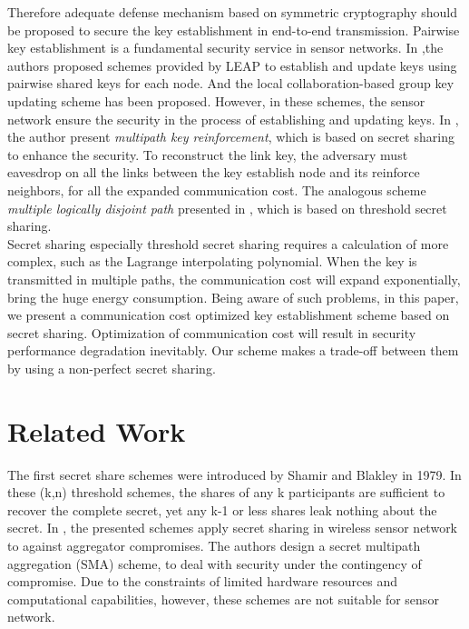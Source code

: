 \documentclass[nocopyrightspace,9pt]{sigplanconf}
\begin{document}
Therefore adequate defense mechanism based on symmetric cryptography
should be proposed to secure the key establishment in end-to-end
transmission. Pairwise key establishment is a fundamental security service in sensor networks\cite{liu2005establishing}.
In \cite{zhu2006leap},the authors proposed schemes provided by LEAP to establish
and update keys using pairwise shared keys for each node. And the local
collaboration-based group key updating scheme has been proposed\cite{zhang2005group}.
However, in these schemes, the sensor network
ensure the security in the process of establishing and updating keys.
In \cite{chan2003random}, the author present \textit{multipath key reinforcement}, which is based
on secret sharing to enhance the security. To reconstruct the
link key, the adversary must eavesdrop on all
the links between the key establish node and its reinforce neighbors, for all the
expanded communication cost. The analogous scheme \textit{multiple logically disjoint path} presented in
\cite{zhu2003establishing}, which is based on threshold secret sharing.\\

Secret sharing especially threshold secret sharing requires a calculation of more
complex, such as the Lagrange interpolating polynomial\cite{Shamir:secret}.
When the key is transmitted in multiple paths, the communication cost will
expand exponentially, bring the huge energy consumption. Being aware of such
problems, in this paper, we present a communication cost optimized key
establishment scheme based on secret sharing. Optimization of communication
cost will result in security performance degradation inevitably. Our scheme makes a trade-off
between them by using a non-perfect secret sharing.
\section{Related Work}
The first secret share schemes were introduced by Shamir\cite{Shamir:secret}
and Blakley\cite{Blakley1979} in 1979. In these (k,n) threshold schemes,
the shares of any k participants are sufficient to recover the complete secret,
yet any k-1 or less shares leak nothing about the secret.
In \cite{claveirole2008securing}, the presented schemes apply secret sharing
in wireless sensor network to against aggregator compromises.
The authors design a secret multipath aggregation (SMA) scheme, to deal with security
under the contingency of compromise. Due to the constraints of limited hardware resources
and computational capabilities, however, these schemes are not suitable for sensor network.\\
\end{document}

